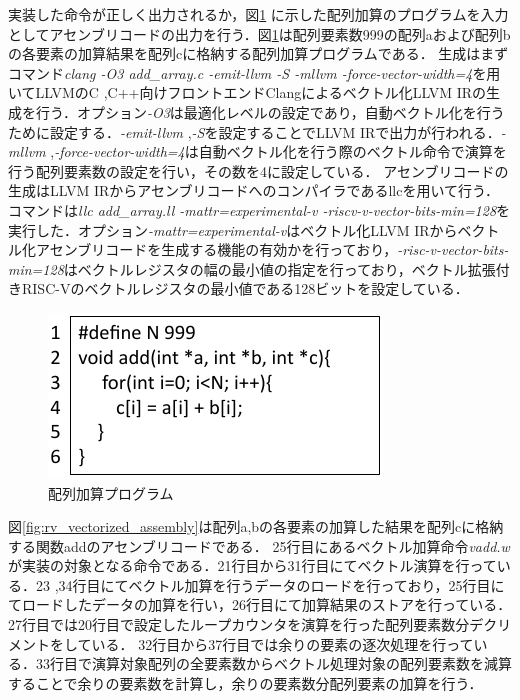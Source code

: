 
実装した命令が正しく出力されるか，図\ref{fig:add_array_c}
に示した配列加算のプログラムを入力としてアセンブリコードの出力を行う．図\ref{fig:add_array_c}は配列要素数999の配列aおよび配列bの各要素の加算結果を配列cに格納する配列加算プログラムである．
生成はまずコマンド\textit{clang -O3 add\_array.c -emit-llvm -S -mllvm -force-vector-width=4}を用いてLLVMのC ,C++向けフロントエンドClangによるベクトル化LLVM IRの生成を行う．オプション\textit{-O3}は最適化レベルの設定であり，自動ベクトル化を行うために設定する．\textit{-emit-llvm} ,\textit{-S}を設定することでLLVM IRで出力が行われる．\textit{-mllvm} ,\textit{-force-vector-width=4}は自動ベクトル化を行う際のベクトル命令で演算を行う配列要素数の設定を行い，その数を4に設定している．
アセンブリコードの生成はLLVM IRからアセンブリコードへのコンパイラであるllcを用いて行う．コマンドは\textit{llc add\_array.ll -mattr=experimental-v -riscv-v-vector-bits-min=128}を実行した．オプション\textit{-mattr=experimental-v}はベクトル化LLVM IRからベクトル化アセンブリコードを生成する機能の有効かを行っており，\textit{-risc-v-vector-bits-min=128}はベクトルレジスタの幅の最小値の指定を行っており，ベクトル拡張付きRISC-Vのベクトルレジスタの最小値である128ビットを設定している．

\begin{figure}[tb]
    \centering
    \includegraphics[scale=1.2]{image/add_array_c.pdf}
    \caption{配列加算プログラム}
    \label{fig:add_array_c}
\end{figure}

図\ref{fig:rv_vectorized_assembly}は配列a,bの各要素の加算した結果を配列cに格納する関数addのアセンブリコードである．
25行目にあるベクトル加算命令\textit{vadd.w}が実装の対象となる命令である．21行目から31行目にてベクトル演算を行っている．23 ,34行目にてベクトル加算を行うデータのロードを行っており，25行目にてロードしたデータの加算を行い，26行目にて加算結果のストアを行っている．27行目では20行目で設定したループカウンタを演算を行った配列要素数分デクリメントをしている．
32行目から37行目では余りの要素の逐次処理を行っている．33行目で演算対象配列の全要素数からベクトル処理対象の配列要素数を減算することで余りの要素数を計算し，余りの要素数分配列要素の加算を行う．

